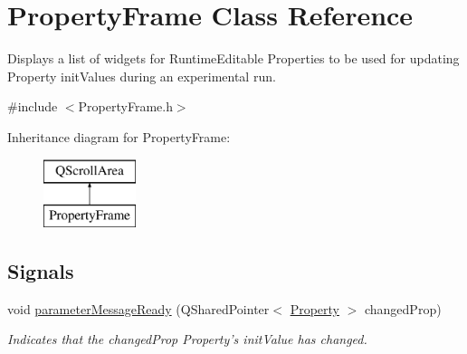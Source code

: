 \hypertarget{class_property_frame}{\section{Property\-Frame Class Reference}
\label{class_property_frame}
}


Displays a list of widgets for Runtime\-Editable Properties to be used for updating Property init\-Values during an experimental run.  




{\ttfamily \#include $<$Property\-Frame.\-h$>$}

Inheritance diagram for Property\-Frame\-:\begin{figure}[H]
\begin{center}
\leavevmode
\includegraphics[height=2.000000cm]{class_property_frame}
\end{center}
\end{figure}
\subsection*{Signals}
\begin{DoxyCompactItemize}
\item 
void \hyperlink{class_property_frame_ad7ddd1a1b2d9cf25db6670a8c458bcc7}{parameter\-Message\-Ready} (Q\-Shared\-Pointer$<$ \hyperlink{class_picto_1_1_property}{Property} $>$ changed\-Prop)
\begin{DoxyCompactList}\small\item\em Indicates that the changed\-Prop Property's init\-Value has changed. \end{DoxyCompactList}\end{DoxyCompactItemize}
